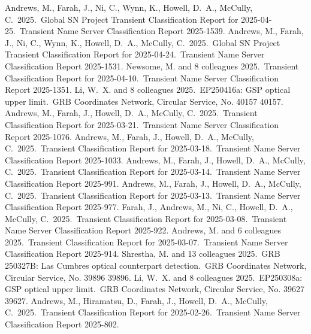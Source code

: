\documentclass[margin,line]{res}
\begin{document}
\begin{resume}
 Andrews, M., Farah, J., Ni, C., Wynn, K., Howell, D.~A., McCully, C.\ 2025.\ Global SN Project Transient Classification Report for 2025-04-25.\ Transient Name Server Classification Report 2025-1539.
 Andrews, M., Farah, J., Ni, C., Wynn, K., Howell, D.~A., McCully, C.\ 2025.\ Global SN Project Transient Classification Report for 2025-04-24.\ Transient Name Server Classification Report 2025-1531.
 Newsome, M. and 8 colleagues 2025.\ Transient Classification Report for 2025-04-10.\ Transient Name Server Classification Report 2025-1351.
 Li, W.~X. and 8 colleagues 2025.\ EP250416a: GSP optical upper limit.\ GRB Coordinates Network, Circular Service, No. 40157 40157.
 Andrews, M., Farah, J., Howell, D.~A., McCully, C.\ 2025.\ Transient Classification Report for 2025-03-21.\ Transient Name Server Classification Report 2025-1076.
 Andrews, M., Farah, J., Howell, D.~A., McCully, C.\ 2025.\ Transient Classification Report for 2025-03-18.\ Transient Name Server Classification Report 2025-1033.
 Andrews, M., Farah, J., Howell, D.~A., McCully, C.\ 2025.\ Transient Classification Report for 2025-03-14.\ Transient Name Server Classification Report 2025-991.
 Andrews, M., Farah, J., Howell, D.~A., McCully, C.\ 2025.\ Transient Classification Report for 2025-03-13.\ Transient Name Server Classification Report 2025-977.
 Farah, J., Andrews, M., Ni, C., Howell, D.~A., McCully, C.\ 2025.\ Transient Classification Report for 2025-03-08.\ Transient Name Server Classification Report 2025-922.
 Andrews, M. and 6 colleagues 2025.\ Transient Classification Report for 2025-03-07.\ Transient Name Server Classification Report 2025-914.
 Shrestha, M. and 13 colleagues 2025.\ GRB 250327B: Las Cumbres optical counterpart detection.\ GRB Coordinates Network, Circular Service, No. 39896 39896.
 Li, W.~X. and 8 colleagues 2025.\ EP250308a: GSP optical upper limit.\ GRB Coordinates Network, Circular Service, No. 39627 39627.
 Andrews, M., Hiramatsu, D., Farah, J., Howell, D.~A., McCully, C.\ 2025.\ Transient Classification Report for 2025-02-26.\ Transient Name Server Classification Report 2025-802.

\end{resume}
\end{document}
